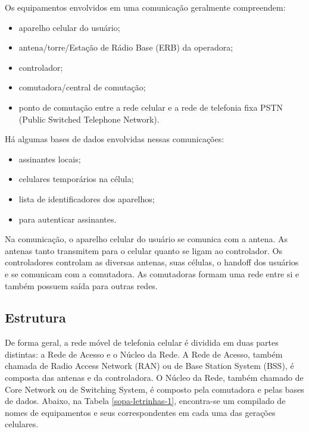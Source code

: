 \documentclass[11pt,oneside,a4paper]{abntex2}
\begin{document}
Os equipamentos envolvidos em uma comunicação geralmente compreendem:
\begin{itemize}
	\item aparelho celular do usuário;
	\item antena/torre/Estação de Rádio Base (ERB) da operadora;
	\item controlador;
	\item comutadora/central de comutação;
	\item ponto de comutação entre a rede celular e a rede de telefonia fixa PSTN (Public Switched Telephone Network).
\end{itemize}

Há algumas bases de dados envolvidas nessas comunicações:
\begin{itemize}
	\item assinantes locais;
	\item celulares temporários na célula;
	\item lista de identificadores dos aparelhos;
	\item para autenticar assinantes.
\end{itemize}

Na comunicação, o aparelho celular do usuário se comunica com a antena. As antenas tanto transmitem para o celular quanto se ligam ao controlador. Os controladores controlam as diversas antenas, suas células, o handoff dos usuários e se comunicam com a comutadora. As comutadoras formam uma rede entre si e também possuem saída para outras redes.

\subsection*{Estrutura}

De forma geral, a rede móvel de telefonia celular é dividida em duas partes distintas: a Rede de Acesso e o Núcleo da Rede. A Rede de Acesso, também chamada de Radio Access Network (RAN) ou de Base Station System (BSS), é composta das antenas e da controladora. O Núcleo da Rede, também chamado de Core Network ou de Switching System, é composto pela comutadora e pelas bases de dados. Abaixo, na Tabela \ref{sopa-letrinhas-1}, encontra-se um compilado de nomes de equipamentos e seus correspondentes em cada uma das gerações celulares.
\end{document}
